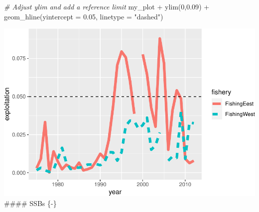 \documentclass[
]{book}
\newenvironment{Shaded}{\begin{snugshade}}{\end{snugshade}}
\newcommand{\AttributeTok}[1]{\textcolor[rgb]{0.77,0.63,0.00}{#1}}
\newcommand{\CommentTok}[1]{\textcolor[rgb]{0.56,0.35,0.01}{\textit{#1}}}
\newcommand{\DecValTok}[1]{\textcolor[rgb]{0.00,0.00,0.81}{#1}}
\newcommand{\FloatTok}[1]{\textcolor[rgb]{0.00,0.00,0.81}{#1}}
\newcommand{\FunctionTok}[1]{\textcolor[rgb]{0.00,0.00,0.00}{#1}}
\newcommand{\NormalTok}[1]{#1}
\newcommand{\SpecialCharTok}[1]{\textcolor[rgb]{0.00,0.00,0.00}{#1}}
\newcommand{\StringTok}[1]{\textcolor[rgb]{0.31,0.60,0.02}{#1}}
\begin{document}
\begin{Shaded}
\begin{Highlighting}[]
\CommentTok{\# Adjust ylim and add a reference limit}
\NormalTok{my\_plot }\SpecialCharTok{+} \FunctionTok{ylim}\NormalTok{(}\DecValTok{0}\NormalTok{,}\FloatTok{0.09}\NormalTok{) }\SpecialCharTok{+} \FunctionTok{geom\_hline}\NormalTok{(}\AttributeTok{yintercept =} \FloatTok{0.05}\NormalTok{, }\AttributeTok{linetype =} \StringTok{"dashed"}\NormalTok{)}
\end{Highlighting}
\end{Shaded}

\includegraphics{_main_files/figure-latex/pressures_alt_again-1.pdf}
\#\#\#\# SSBs \{-\}
\end{document}
